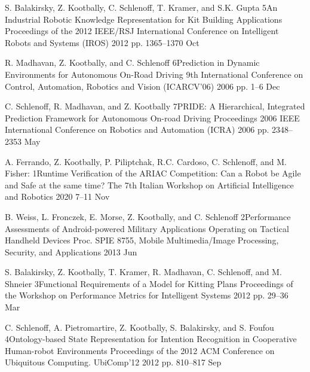 \cvinproceedings
{S. Balakirsky, Z. Kootbally, C. Schlenoff, T. Kramer, and S.K. Gupta}%
{5}{An Industrial Robotic Knowledge Representation for Kit Building Applications}%
{Proceedings of the 2012 IEEE/RSJ International Conference on Intelligent Robots and Systems (IROS)}%
{2012}%
{pp. 1365--1370}%
{Oct}%



\cvinproceedings
{R. Madhavan, Z. Kootbally, and C. Schlenoff}%
{6}{Prediction in Dynamic Environments for Autonomous On-Road Driving}%
{9th International Conference on Control, Automation, Robotics and Vision (ICARCV'06)}%
{2006}%
{pp. 1--6}%
{Dec}%

\cvinproceedings
{C. Schlenoff, R. Madhavan, and Z. Kootbally}%
{7}{PRIDE: A Hierarchical, Integrated Prediction Framework for Autonomous On-road Driving}%
{Proceedings 2006 IEEE International Conference on Robotics and Automation (ICRA)}%
{2006}%
{pp. 2348--2353}%
{May}%



\cvinproceedings
{A. Ferrando, Z. Kootbally, P. Piliptchak, R.C. Cardoso, C. Schlenoff, and M. Fisher:}%
{1}{Runtime Verification of the ARIAC Competition: Can a Robot be Agile and Safe at the same time?}%
{The 7th Italian Workshop on Artificial Intelligence and Robotics}%
{2020}%
{7--11}%
{Nov}%


\cvinproceedings
{B. Weiss, L. Fronczek, E. Morse, Z. Kootbally, and C. Schlenoff}%
{2}{Performance Assessments of Android-powered Military Applications Operating on Tactical Handheld Devices}%
{Proc. SPIE 8755, Mobile Multimedia/Image Processing, Security, and Applications}%
{2013}%
{}%
{Jun}%

\cvinproceedings
{S. Balakirsky, Z. Kootbally, T. Kramer, R. Madhavan, C. Schlenoff, and M. Shneier}%
{3}{Functional Requirements of a Model for Kitting Plans}%
{Proceedings of the Workshop on Performance Metrics for Intelligent Systems}%
{2012}%
{pp. 29--36}%
{Mar}%

\cvinproceedings
{C. Schlenoff, A. Pietromartire, Z. Kootbally, S. Balakirsky, and S. Foufou}%
{4}{Ontology-based State Representation for Intention Recognition in Cooperative Human-robot Environments}%
{Proceedings of the 2012 ACM Conference on Ubiquitous Computing. UbiComp’12}%
{2012}%
{pp. 810--817}%
{Sep}%


